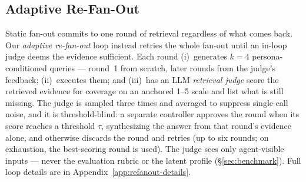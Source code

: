 
\subsection{Adaptive Re-Fan-Out}
\label{sec:method-refanout}

Static fan-out commits to one round of retrieval regardless of what comes
back. Our \emph{adaptive re-fan-out} loop instead retries the whole fan-out
until an in-loop judge deems the evidence sufficient. Each round (i)~generates
$k{=}4$ persona-conditioned queries --- round~1 from scratch, later rounds
from the judge's feedback; (ii)~executes them; and (iii)~has an LLM
\emph{retrieval judge} score the retrieved evidence for coverage on an
anchored 1--5 scale and list what is still missing. The judge is sampled
three times and averaged to suppress single-call noise, and it is
threshold-blind: a separate controller approves the round when its score
reaches a threshold $\tau$, synthesizing the answer from that round's
evidence alone, and otherwise discards the round and retries (up to six
rounds; on exhaustion, the best-scoring round is used). The judge sees only
agent-visible inputs --- never the evaluation rubric or the latent profile
(\S\ref{sec:benchmark}). Full loop details are in
Appendix~\ref{app:refanout-details}.

